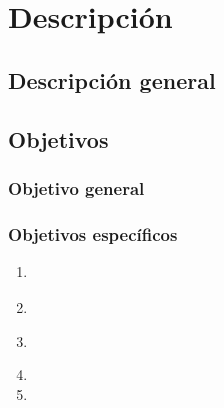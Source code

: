 \section{Descripción}
\subsection{Descripción general}

\lipsum[1-2]

\subsection{Objetivos}
\subsubsection{Objetivo general}

\lipsum[1-2] \parencite{knuth1984texbook}

\subsubsection{Objetivos específicos}

\lipsum[1]
\begin{enumerate}
    \item \lipsum[1][1-2] \parencite{shannon1948mathematical}
    \item \lipsum[1][1-2]
    \item \lipsum[1][1-2] \parencite{lamport1994latex}
    \item \lipsum[1][1-2]
    \item \lipsum[1][1-2]
\end{enumerate}